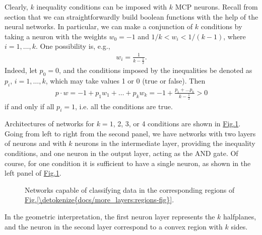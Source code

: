 \documentclass[letterpaper,10pt,english]{jupyterBook}
\let\sphinxpxdimen\pdfpxdimen\else\newdimen\sphinxpxdimen
\begin{document}
\sphinxAtStartPar
Clearly, \(k\) inequality conditions can be imposed with \(k\) MCP neurons.
Recall from section {\hyperref[\detokenize{docs/mcp:bool-sec}]{}} that we can straightforwardly build boolean functions with the help of the neural networks. In particular, we can make a conjunction of \(k\) conditions by taking a neuron with the weights \(w_0=-1\) and \(1/k < w_i < 1/(k-1)\), where \(i=1,\dots,k\). One possibility is, e.g.,
\begin{equation*}
\begin{split}w_i=\frac{1}{k-\frac{1}{2}}.\end{split}
\end{equation*}
\sphinxAtStartPar
Indeed, let \(p_0=0\), and the conditions imposed by the inequalities be denoted as \(p_i\), \(i=1,\dots,k\), which may take values 1 or 0 (true or false). Then
\begin{equation*}
\begin{split}p \cdot w =-1 + p_1 w_1 + \dots + p_k w_k = -1+\frac{p_1+\dots p_k}{k-\frac{1}{2}} > 0\end{split}
\end{equation*}
\sphinxAtStartPar
if and only if all \(p_i=1\), i.e. all the conditions are true.

\sphinxAtStartPar
Architectures of networks for \(k=1\), 2, 3, or 4 conditions are shown in \hyperref[\detokenize{docs/more_layers:nfn-fig}]{Fig.\@ \ref{\detokenize{docs/more_layers:nfn-fig}}}. Going from left to right from the second panel, we have networks with two layers of neurons and with \(k\) neurons in the intermediate layer, providing the inequality conditions, and one neuron in the output layer, acting as the AND gate. Of course, for one condition it is sufficient to have a single neuron, as shown in the left panel of \hyperref[\detokenize{docs/more_layers:nfn-fig}]{Fig.\@ \ref{\detokenize{docs/more_layers:nfn-fig}}}.

\begin{figure}[htbp]
\centering
\capstart

\noindent\sphinxincludegraphics[width=820\sphinxpxdimen]{{nf1-4}.png}
\caption{Networks capable of classifying data in the corresponding regions of \hyperref[\detokenize{docs/more_layers:regions-fig}]{Fig.\@ \ref{\detokenize{docs/more_layers:regions-fig}}}.}\label{\detokenize{docs/more_layers:nfn-fig}}\end{figure}

\sphinxAtStartPar
In the geometric interpretation, the first neuron layer represents the \(k\) half\sphinxhyphen{}planes, and the neuron in the second layer correspond to a convex region with \(k\) sides.
\end{document}
